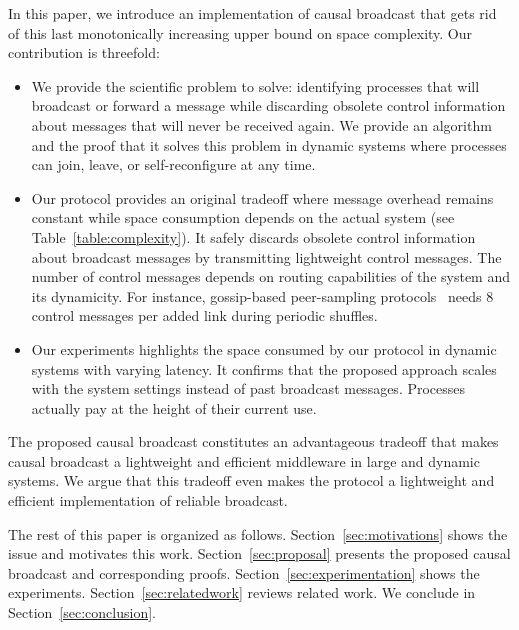 In this paper, we introduce an implementation of causal broadcast that gets rid
of this last monotonically increasing upper bound on space complexity.  Our
contribution is threefold:
\begin{itemize}[leftmargin=*]
\item We provide the scientific problem to solve: identifying processes that
  will broadcast or forward a message while discarding obsolete control
  information about messages that will never be received again. We provide an
  algorithm and the proof that it solves this problem in dynamic systems where
  processes can join, leave, or self-reconfigure at any time.
\item Our protocol provides an original tradeoff where message overhead remains
  constant while space consumption depends on the actual system (see
  Table~\ref{table:complexity}). It safely discards obsolete control information
  about broadcast messages by transmitting lightweight control messages. The
  number of control messages depends on routing capabilities of the system and
  its dynamicity. For instance, gossip-based peer-sampling
  protocols~\cite{jelasity2007gossip,jelasity2009tman,nedelec2017adaptive} needs
  8 control messages per added link during periodic shuffles.
\item Our experiments highlights the space consumed by our protocol in dynamic
  systems with varying latency. It confirms that the proposed approach scales
  with the system settings instead of past broadcast messages. Processes
  actually pay at the height of their current use.
\end{itemize}
The proposed causal broadcast constitutes an advantageous tradeoff that makes
causal broadcast a lightweight and efficient middleware in large and dynamic
systems. We argue that this tradeoff even makes the protocol a lightweight and
efficient implementation of reliable broadcast.

The rest of this paper is organized as follows. Section~\ref{sec:motivations}
shows the issue and motivates this work. Section~\ref{sec:proposal} presents the
proposed causal broadcast and corresponding
proofs. Section~\ref{sec:experimentation} shows the
experiments. Section~\ref{sec:relatedwork} reviews related work. We conclude in
Section~\ref{sec:conclusion}.


